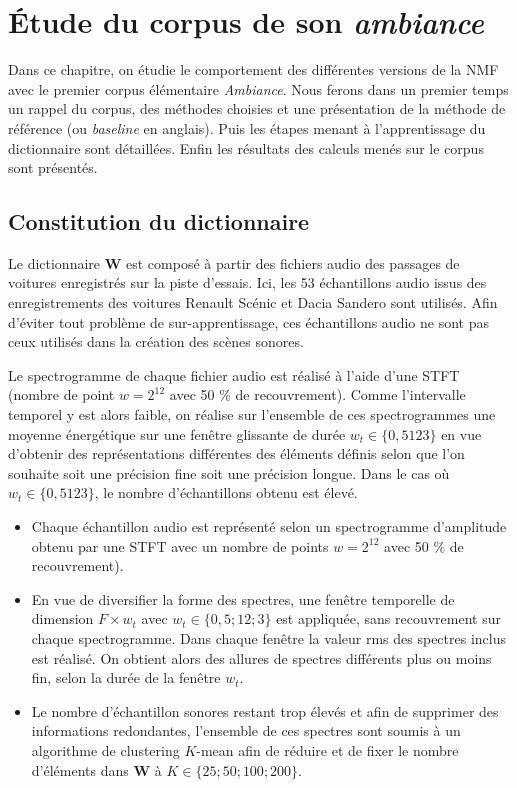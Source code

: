 
\chapter{\'Etude du corpus de son \textit{ambiance}}
\label{chap:ambiance}
Dans ce chapitre, on étudie le comportement des différentes versions de la NMF avec le premier corpus élémentaire \textit{Ambiance}.
Nous ferons dans un premier temps un rappel du corpus, des méthodes choisies et une présentation de la méthode de référence (ou \textit{baseline} en anglais). Puis les étapes menant à l'apprentissage du dictionnaire sont détaillées. Enfin les résultats des calculs menés sur le corpus sont présentés.


\section{Constitution du dictionnaire}

Le dictionnaire $\mathbf{W}$ est composé à partir des fichiers audio des passages de voitures enregistrés sur la piste d'essais. Ici, les 53 échantillons audio issus des enregistrements des voitures Renault Scénic et Dacia Sandero sont utilisés. Afin d'éviter tout problème de sur-apprentissage, ces échantillons audio ne sont pas ceux utilisés dans la création des scènes sonores.

Le spectrogramme de chaque fichier audio est réalisé à l'aide d'une STFT (nombre de point $w = 2^12$ avec 50 $\%$ de recouvrement). Comme l'intervalle temporel y est alors faible, on réalise sur l'ensemble de ces spectrogrammes une moyenne énergétique sur une fenêtre glissante de durée $w_t \in \lbrace 0,5 1 2 3 \rbrace$ en vue d'obtenir des représentations différentes des éléments définis selon que l'on souhaite soit une précision fine soit une précision longue. 
Dans le cas où $w_t \in \lbrace 0,5 1 2 3 \rbrace$, le nombre d'échantillons obtenu est élevé.

\begin{itemize}
\item Chaque échantillon  audio est représenté selon un spectrogramme d'amplitude obtenu par une STFT avec un nombre de points $w = 2^{12}$ avec 50 $\%$ de recouvrement).
\item En vue de diversifier la forme des spectres, une fenêtre temporelle de dimension $F \times w_t$ avec $w_t\in \lbrace 0,5; 1 2; 3 \rbrace$ est appliquée, sans recouvrement sur chaque spectrogramme. Dans chaque fenêtre la valeur rms des spectres inclus est réalisé. On obtient alors des allures de spectres différents plus ou moins fin, selon la durée de la fenêtre $w_t$.
\item Le nombre d'échantillon sonores restant trop élevés et afin de supprimer des informations redondantes, l'ensemble de ces spectres sont soumis à un algorithme de clustering $K$-mean afin de réduire et de fixer le nombre d'éléments dans $\mathbf{W}$ à $K \in \lbrace 25; 50; 100; 200 \rbrace$.
\end{itemize}

